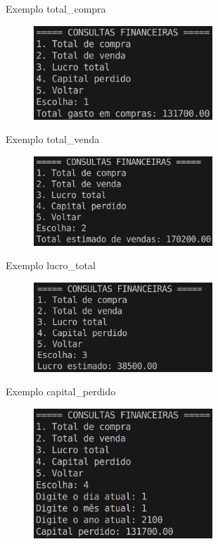 \documentclass{beamer}
\begin{document}
\begin{frame}{Exemplo total\_compra}
    \begin{figure}
        \centering
        \includegraphics[width=0.6\textwidth]{img/total-compra.png}
    \end{figure}   
\end{frame}

\begin{frame}{Exemplo total\_venda}
    \begin{figure}
        \centering
        \includegraphics[width=0.6\textwidth]{img/total-venda.png}
    \end{figure}
\end{frame}

\begin{frame}{Exemplo lucro\_total}
    \begin{figure}
        \centering
        \includegraphics[width=0.6\textwidth]{img/lucro.png}
    \end{figure}   
\end{frame}

\begin{frame}{Exemplo capital\_perdido}
    \begin{figure}
        \centering
        \includegraphics[width=0.6\textwidth]{img/capital-perdido.png}
    \end{figure}   
\end{frame}
\end{document}
